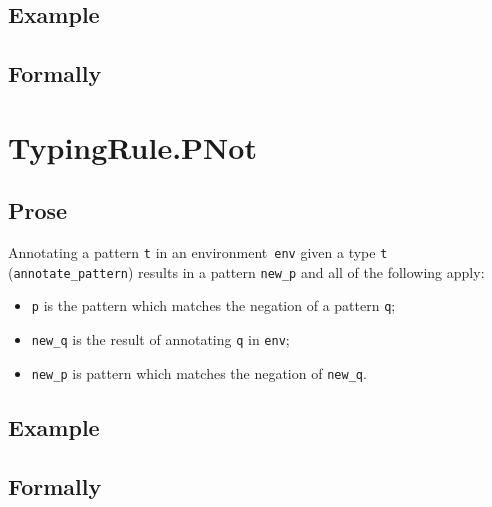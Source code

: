 \documentclass{book}
\begin{document}
\begin{itemize}
  \subsection{Example}



\begin{emptyformal}
    \subsection{Formally}
\end{emptyformal}


\section{TypingRule.PNot \label{sec:TypingRule.PNot}}

  \subsection{Prose}
   Annotating a pattern \texttt{t} in an environment~\texttt{env} given a type \texttt{t} (\texttt{annotate\_pattern}) results in a pattern \texttt{new\_p} and all of the following apply:
   \begin{itemize}
   \item \texttt{p} is the pattern which matches the negation of a pattern \texttt{q};
   \item \texttt{new\_q} is the result of annotating \texttt{q} in \texttt{env};
   \item \texttt{new\_p} is pattern which matches the negation of \texttt{new\_q}.
   \end{itemize}

  \subsection{Example}



\begin{emptyformal}
    \subsection{Formally}
\end{emptyformal}


\end{itemize}
\end{document}
